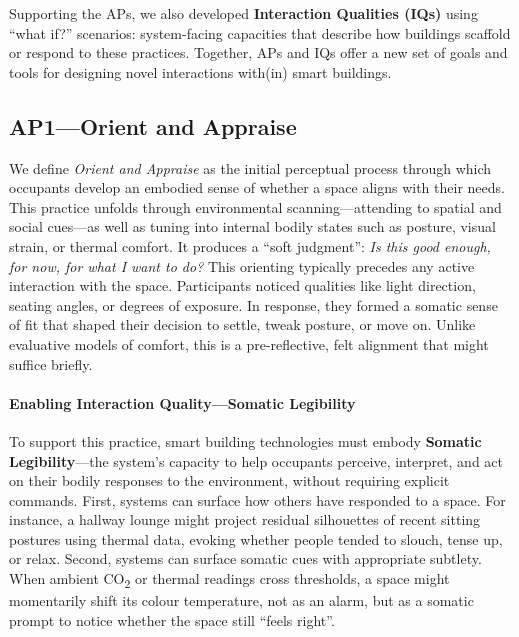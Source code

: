 Supporting the APs, we also developed \textbf{Interaction Qualities (IQs)} using ``what if?'' scenarios: system-facing capacities that describe how buildings scaffold or respond to these practices. Together, APs and IQs offer a new set of goals and tools for designing novel interactions with(in) smart buildings.



\subsection{AP1---Orient and Appraise}
We define \textit{Orient and Appraise} as the initial perceptual process through which occupants develop an embodied sense of whether a space aligns with their needs. This practice unfolds through environmental scanning---attending to spatial and social cues---as well as tuning into internal bodily states such as posture, visual strain, or thermal comfort. It produces a ``soft judgment'': \textit{Is this good enough, for now, for what I want to do?} This orienting typically precedes any active interaction with the space. Participants noticed qualities like light direction, seating angles, or degrees of exposure. In response, they formed a somatic sense of fit that shaped their decision to settle, tweak posture, or move on. Unlike evaluative models of comfort, this is a pre-reflective, felt alignment that might suffice briefly.

\paragraph{Enabling Interaction Quality---Somatic Legibility}
To support this practice, smart building technologies must embody \textbf{Somatic Legibility}---the system’s capacity to help occupants perceive, interpret, and act on their bodily responses to the environment, without requiring explicit commands. First, systems can surface how others have responded to a space. For instance, a hallway lounge might project residual silhouettes of recent sitting postures using thermal data, evoking whether people tended to slouch, tense up, or relax. Second, systems can surface somatic cues with appropriate subtlety. When ambient CO\textsubscript{2} or thermal readings cross thresholds, a space might momentarily shift its colour temperature, not as an alarm, but as a somatic prompt to notice whether the space still ``feels right''. 


